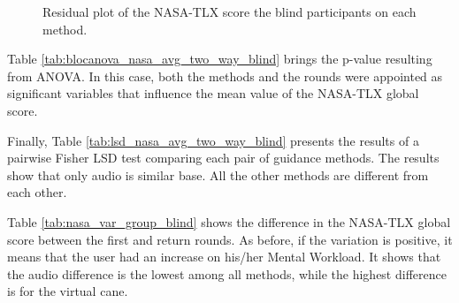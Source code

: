 \begin{figure}[!htb]
\begin{minipage}{0.45\textwidth}
        \caption{Residual plot of the NASA-TLX score the blind participants on each method.}
        \label{fig:residplot_nasa_avg_two_way_blind}
    \end{minipage}
\end{figure}

Table \ref{tab:blocanova_nasa_avg_two_way_blind} brings the p-value resulting from ANOVA. In this case, both the methods and the rounds were appointed as significant variables that influence the mean value of the NASA-TLX global score. 



Finally, Table \ref{tab:lsd_nasa_avg_two_way_blind} presents the results of a pairwise Fisher LSD test comparing each pair of guidance methods. The results show that only audio is similar base. All the other methods are different from each other.



Table \ref{tab:nasa_var_group_blind} shows the difference in the NASA-TLX global score between the first and return rounds. As before, if the variation is positive, it means that the user had an increase on his/her Mental Workload. It shows that the audio difference is the lowest among all methods, while the highest difference is for the virtual cane.



\FloatBarrier